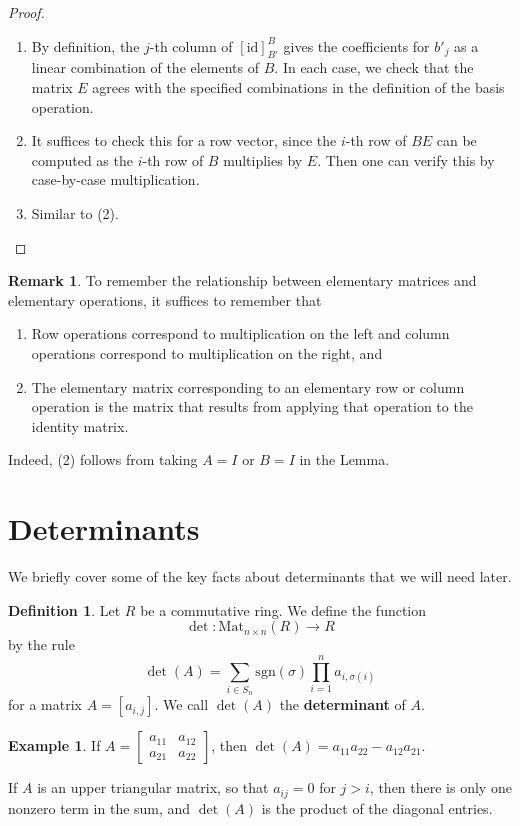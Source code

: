 \documentclass[12pt]{report}
\numberwithin{equation}{section}
\numberwithin{theorem}{chapter}
\theoremstyle{definition}
\newtheorem{definition}[theorem]{Definition}
\newtheorem{example}[theorem]{Example}
\newtheorem*{basic properties}{Basic Properties}
\newtheorem*{Important Remark}{Important Remark}
\newtheorem{remark}[theorem]{Remark}
\begin{document}
\begin{proof}
\begin{enumerate}
\item By definition, the $j$-th column of $[\mathrm{id}]_{B'}^B$ gives the coefficients for $b'_j$ as a linear combination of the elements of $B$. In each case, we check that the matrix $E$ agrees with the specified combinations in the definition of the basis operation.
\item It suffices to check this for a row vector, since the $i$-th row of $BE$ can be computed as the $i$-th row of $B$ multiplies by $E$. Then one can verify this by case-by-case multiplication.
\item Similar to (2).
\end{enumerate}
\end{proof}


\begin{remark}
To remember the relationship between elementary matrices and elementary operations, it suffices to remember that 
\begin{enumerate}
\item Row operations correspond to multiplication on the left and column operations correspond to multiplication on the right, and 
\item The elementary matrix corresponding to an elementary row or column operation is the matrix that results from applying that operation to the identity matrix.
\end{enumerate}
Indeed, (2) follows from taking $A=I$ or $B=I$ in the Lemma.
\end{remark}

\section{Determinants}

We briefly cover some of the key facts about determinants that we will need later.

\begin{definition} Let $R$ be a commutative ring. We define the function
\[ \det: \mathrm{Mat}_{n\times n}(R) \to R\] by the rule
\[ \det(A) = \sum_{i\in S_n} \mathrm{sgn}(\sigma) \prod_{i=1}^n {a_{i,\sigma(i)}}\]
for a matrix $A=[a_{i,j}]$.
We call $\det(A)$ the \textbf{determinant} of $A$.
\end{definition}

\begin{example}
If $A= \begin{bmatrix} a_{11} & a_{12} \\ a_{21} & a_{22}\end{bmatrix}$, then $\det(A)=a_{11} a_{22} - a_{12} a_{21}$. 

If $A$ is an upper triangular matrix, so that $a_{ij}=0$ for $j>i$, then there is only one nonzero term in the sum, and $\det(A)$ is the product of the diagonal entries.
\end{example}
\end{document}
